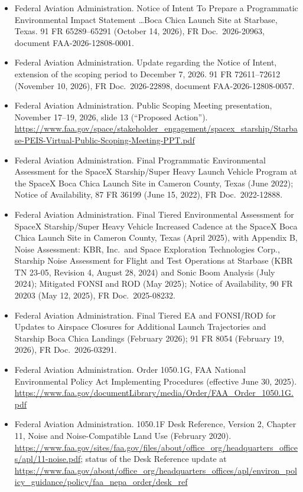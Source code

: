 \documentclass[11pt]{article}
\begin{document}
\begin{itemize}[leftmargin=*, itemsep=1pt]
\item Federal Aviation Administration. Notice of Intent To Prepare a Programmatic Environmental Impact Statement \ldots Boca Chica Launch Site at Starbase, Texas. 91 FR 65289--65291 (October 14, 2026), FR Doc.\ 2026-20963, document FAA-2026-12808-0001.
\item Federal Aviation Administration. Update regarding the Notice of Intent, extension of the scoping period to December 7, 2026. 91 FR 72611--72612 (November 10, 2026), FR Doc.\ 2026-22898, document FAA-2026-12808-0057.
\item Federal Aviation Administration. Public Scoping Meeting presentation, November 17--19, 2026, slide 13 (``Proposed Action''). \url{https://www.faa.gov/space/stakeholder_engagement/spacex_starship/Starbase-PEIS-Virtual-Public-Scoping-Meeting-PPT.pdf}
\item Federal Aviation Administration. Final Programmatic Environmental Assessment for the SpaceX Starship/Super Heavy Launch Vehicle Program at the SpaceX Boca Chica Launch Site in Cameron County, Texas (June 2022); Notice of Availability, 87 FR 36199 (June 15, 2022), FR Doc.\ 2022-12888.
\item Federal Aviation Administration. Final Tiered Environmental Assessment for SpaceX Starship/Super Heavy Vehicle Increased Cadence at the SpaceX Boca Chica Launch Site in Cameron County, Texas (April 2025), with Appendix B, Noise Assessment: KBR, Inc.\ and Space Exploration Technologies Corp., Starship Noise Assessment for Flight and Test Operations at Starbase (KBR TN 23-05, Revision 4, August 28, 2024) and Sonic Boom Analysis (July 2024); Mitigated FONSI and ROD (May 2025); Notice of Availability, 90 FR 20203 (May 12, 2025), FR Doc.\ 2025-08232.
\item Federal Aviation Administration. Final Tiered EA and FONSI/ROD for Updates to Airspace Closures for Additional Launch Trajectories and Starship Boca Chica Landings (February 2026); 91 FR 8054 (February 19, 2026), FR Doc.\ 2026-03291.
\item Federal Aviation Administration. Order 1050.1G, FAA National Environmental Policy Act Implementing Procedures (effective June 30, 2025). \url{https://www.faa.gov/documentLibrary/media/Order/FAA_Order_1050.1G.pdf}
\item Federal Aviation Administration. 1050.1F Desk Reference, Version 2, Chapter 11, Noise and Noise-Compatible Land Use (February 2020). \url{https://www.faa.gov/sites/faa.gov/files/about/office_org/headquarters_offices/apl/11-noise.pdf}; status of the Desk Reference update at \url{https://www.faa.gov/about/office_org/headquarters_offices/apl/environ_policy_guidance/policy/faa_nepa_order/desk_ref}

\end{itemize}
\end{document}
